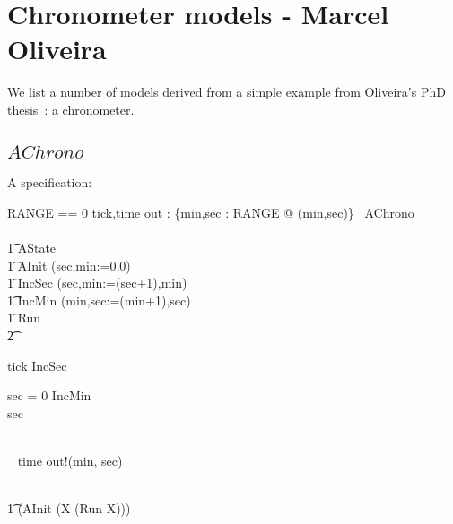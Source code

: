 \section{Chronometer models - Marcel Oliveira~\cite{MV05}}

We list a number of models derived from a simple example from
Oliveira's PhD thesis~\cite{MV05}: a chronometer.

\subsection{$AChrono$}

A specification:
\begin{circus}
RANGE == 0 
\also \circchannel tick,time
\also \circchannel out : \{min,sec : RANGE @ (min,sec)\}
\also
\circprocess\ AChrono \circdef\\
\circbegin\\
\t1 \circstate AState \\
\t1 AInit \circdef (sec,min:=0,0)\\
\t1 IncSec \circdef (sec,min:=(sec+1),min)\\
\t1 IncMin \circdef (min,sec:=(min+1),sec)\\
\t1 Run \circdef \\
\t2 \begin{block}
\begin{block}
  tick \then IncSec \circseq \\
      \begin{block}
        \circif sec = 0 \circthen IncMin\\
        \circelse sec  \circthen \Skip \circfi
      \end{block}
\end{block}\\
    \extchoice~ time \then out!(min, sec) \then \Skip \\
\end{block}\\
\t1 \circspot (AInit \circseq (\circmu X \circspot (Run \circseq X)))\\
\circend
\end{circus}

